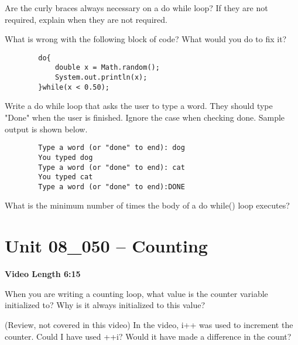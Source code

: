 \documentclass[letterpaper,12pt]{exam}
\newcommand{\unit}{Unit 08}
\begin{document}
\begin{questions}
\begin{samepage}
    \question Are the curly braces always necessary on a do while loop?  If they are not required, explain when they are not required.
    \vspace{5mm}
\end{samepage}


\begin{samepage}
    \question What is wrong with the following block of code?  What would you do to fix it?
    \begin{verbatim}
        do{
            double x = Math.random();
            System.out.println(x);
        }while(x < 0.50);
    \end{verbatim}
    \vspace{5mm}
\end{samepage}
\begin{samepage}
    \question Write a do while loop that asks the user to type a word.  They should type "Done" when the user is finished.  Ignore the case when checking done.  Sample output is shown below.
    \begin{verbatim}
        Type a word (or "done" to end): dog 
        You typed dog
        Type a word (or "done" to end): cat 
        You typed cat
        Type a word (or "done" to end):DONE 
    \end{verbatim}     
       \vspace{15mm}
\end{samepage}

\begin{samepage}
    \question What is the minimum number of times the body of a do{} while() loop executes?
    \vspace{5mm}
\end{samepage}



\section*{\unit\_050 -- Counting} %
\par{\selectfont\textbf{Video Length 6:15}}

\begin{samepage}
    \question When you are writing a counting loop, what value is the counter variable initialized to?  Why is it always initialized to this value?
    \vspace{5mm}
\end{samepage}
\begin{samepage}
    \question (Review, not covered in this video)  In the video, i++ was used to increment the counter.  Could I have used ++i?  Would it have made a difference in the count?
    \vspace{5mm}
\end{samepage}


\end{questions}
\end{document}
